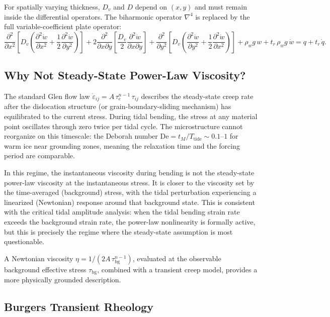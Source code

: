 \documentclass[11pt,letterpaper]{article}
\newcommand{\dd}[2]{\frac{\partial #1}{\partial #2}}
\newcommand{\De}{\text{De}}
\begin{document}
For spatially varying thickness, $D_v$ and $D$ depend on $(x,y)$ and must remain inside the differential operators.  The biharmonic operator $\nabla^4$ is replaced by the full variable-coefficient plate operator:
\begin{equation}
  \dd{^2}{x^2}\!\left[D_v\!\left(\dd{^2\dot{w}}{x^2} + \frac{1}{2}\dd{^2\dot{w}}{y^2}\right)\right]
  + 2\dd{^2}{x\partial y}\!\left[\frac{D_v}{2}\dd{^2\dot{w}}{x\partial y}\right]
  + \dd{^2}{y^2}\!\left[D_v\!\left(\dd{^2\dot{w}}{y^2} + \frac{1}{2}\dd{^2\dot{w}}{x^2}\right)\right]
  + \rho_w g\,w + t_r\,\rho_w g\,\dot{w} = q + t_r\,\dot{q}.
\end{equation}

\subsection{Why Not Steady-State Power-Law Viscosity?}
\label{sec:why_newtonian}

The standard Glen flow law $\dot{\varepsilon}_{ij} = A\,\tau_e^{n-1}\,\tau_{ij}$ describes the steady-state creep rate after the dislocation structure (or grain-boundary-sliding mechanism) has equilibrated to the current stress.  During tidal bending, the stress at any material point oscillates through zero twice per tidal cycle.  The microstructure cannot reorganize on this timescale: the Deborah number $\De = t_M / T_{\text{tide}} \sim 0.1$--$1$ for warm ice near grounding zones, meaning the relaxation time and the forcing period are comparable.

In this regime, the instantaneous viscosity during bending is not the steady-state power-law viscosity at the instantaneous stress.  It is closer to the viscosity set by the time-averaged (background) stress, with the tidal perturbation experiencing a linearized (Newtonian) response around that background state.  This is consistent with the critical tidal amplitude analysis: when the tidal bending strain rate exceeds the background strain rate, the power-law nonlinearity is formally active, but this is precisely the regime where the steady-state assumption is most questionable.

A Newtonian viscosity $\eta = 1/(2A\,\tau_{\text{bg}}^{n-1})$, evaluated at the observable background effective stress $\tau_{\text{bg}}$, combined with a transient creep model, provides a more physically grounded description.

\subsection{Burgers Transient Rheology}
\label{sec:burgers}
\end{document}
